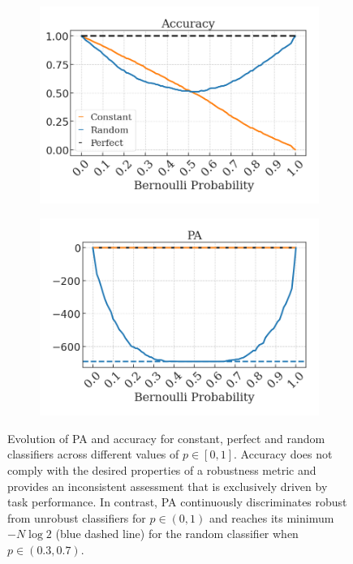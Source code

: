 \begin{figure}[t]
    \centering
    \begin{subfigure}[b]{0.45\textwidth}
        \centering
        \includegraphics[width=\textwidth]{img/results_discussion/empirical/artificial_acc_final.png}
    \end{subfigure}
    \hfill
    \begin{subfigure}[b]{0.45\textwidth}
        \centering
        \includegraphics[width=\textwidth]{img/results_discussion/empirical/artificial_logPA_final.png}
    \end{subfigure}
    \caption{
    Evolution of PA and accuracy for constant, perfect and random classifiers across different 
    values of $p \in [0,1]$. Accuracy does not comply with the desired properties of a robustness metric
    and provides an inconsistent assessment that is exclusively driven by task performance. In contrast,
    PA continuously discriminates robust from unrobust classifiers for $p \in (0,1)$ and reaches 
    its minimum $-N \log 2$ (blue dashed line) for the random classifier when $p \in (0.3,0.7)$.
    }
    \label{fig:empirical_plot}
\end{figure}

